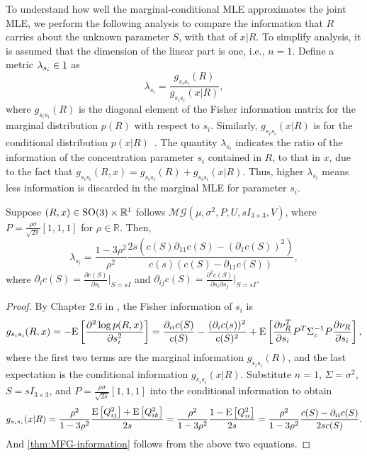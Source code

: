 To understand how well the marginal-conditional MLE approximates the joint MLE, we perform the following analysis to compare the information that $R$ carries about the unknown parameter $S$, with that of $x|R$.
To simplify analysis, it is assumed that the dimension of the linear part is one, i.e., $n=1$.
Define a metric $\lambda_{s_i}\in\real{1}$ as
\begin{equation}
	\lambda_{s_i} = \frac{g_{s_is_i}(R)}{g_{s_is_i}(x|R)},
\end{equation}
where $g_{s_is_i}(R)$ is the diagonal element of the Fisher information matrix for the marginal distribution $p(R)$ with respect to $s_i$.
Similarly, $g_{s_is_i}(x|R)$ is for the conditional distribution $p(x|R)$~\cite[Chapter 9.8]{kullback1997information}.
The quantity $\lambda_{s_i}$ indicates the ratio of the information of the concentration parameter $s_i$ contained in $R$, to that in $x$, due to the fact that $g_{s_is_i}(R,x) = g_{s_is_i}(R)+g_{s_is_i}(x|R)$.
Thus, higher $\lambda_{s_i}$ means less information is discarded in the marginal MLE for parameter $s_i$.

\begin{theorem} \label{thm:MFG-information}
	Suppose $(R,x)\in\mathrm{SO}(3)\times\mathbb{R}^1$ follows  $\mathcal{MG}(\mu,\sigma^2,P,U,sI_{3\times 3},V)$, where $P = \frac{\rho\sigma}{\sqrt{2s}} [1,1,1]$ for $\rho\in\mathbb{R}$. Then,
	\begin{equation} \label{eqn:MFG-information}
		\lambda_{s_i} = \frac{1-3\rho^2}{\rho^2} \frac{2s\left(c(S)\partial_{11}c(S) - (\partial_1c(S))^2\right)}{c(s)\left(c(S)-\partial_{11}c(S)\right)},
	\end{equation}
	where $\partial_i c(S) = \frac{\partial c(S)}{\partial s_i} \big|_{S=sI}$ and $\partial_{ij} c(S) = \frac{\partial^2 c(S)}{\partial s_i \partial s_j} \big|_{S = sI}$.
\end{theorem}
\begin{proof}
	By Chapter 2.6 in \cite{kullback1997information}, the Fisher information of $s_i$ is
	\begin{align*}
		g_{s_is_i}(R,x) = -\mathrm{E}\left[ \frac{\partial^2 \log p(R,x)}{\partial s_i^2} \right] = \frac{\partial_{ii}c(S)}{c(S)} - \frac{(\partial_i c(s))^2}{c(S)^2} + \mathrm{E}\left[ \frac{\partial \nu_R^T}{\partial s_i}P^T\Sigma_c^{-1}P\frac{\partial \nu_R}{\partial s_i} \right],
	\end{align*}
	where the first two terms are the marginal information $g_{s_is_i}(R)$, and the last expectation is the conditional information $g_{s_is_i}(x|R)$.
	Substitute $n=1$, $\Sigma = \sigma^2$, $S = sI_{3\times 3}$, and $P = \frac{\rho\sigma}{\sqrt{2s}}[1,1,1]$ into the conditional information to obtain
	\begin{align*}
		g_{s_is_i}(x|R) = \frac{\rho^2}{1-3\rho^2} \frac{\mathrm{E}\left[ Q_{ij}^2 \right]+\mathrm{E}\left[ Q_{ik}^2 \right]}{2s} = \frac{\rho^2}{1-3\rho^2}\frac{1-\mathrm{E}\left[ Q_{ii}^2 \right]}{2s} = \frac{\rho^2}{1-3\rho^2} \frac{c(S)-\partial_{ii}c(S)}{2sc(S)}.
	\end{align*}
	And \eqref{thm:MFG-information} follows from the above two equations.
\end{proof}

